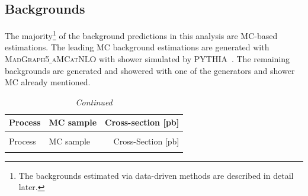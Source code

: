 \subsection{Backgrounds}
The majority\footnote{The backgrounds estimated via data-driven methods are described in detail later.} of the background predictions in this analysis are MC-based estimations. 
The leading MC background estimations are generated with \textsc{MadGraph5$\_$aMCatNLO} with shower simulated by \textsc{PYTHIA}~\cite{aMCatNLO,nlo_showerMC,pythia}. The remaining 
backgrounds are generated and showered with one of the generators and shower MC already mentioned.   

\begin{landscape}
\begin{longtable}{lp{6.0in}r}
  \caption[MC SAMPLES]{MC SAMPLES\label{tab:mc}}\\
  \toprule
 Process & MC sample & Cross-section [pb] \\
  \midrule
\endfirsthead
  \caption[]{{\em Continued}} \\  %
  \midrule
 Process & MC sample & Cross-Section [pb] \\
  \midrule
\endhead
\endfoot
  \bottomrule
\endlastfoot


\end{longtable}
\end{landscape}
